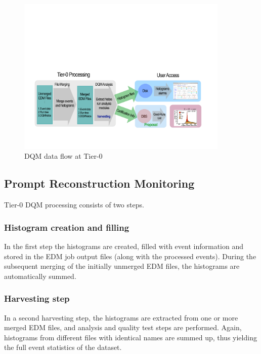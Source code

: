 
\begin{figure}[!htbp]
\begin{center}
\includegraphics[width=0.9\textwidth]{dqm_tier0}
\caption{DQM data flow at Tier-0}
\end{center}
\label{fig:dqmoffline}
\end{figure}

\subsection{Prompt Reconstruction Monitoring}

Tier-0 DQM processing consists of two steps. 

\subsubsection{Histogram creation and filling}
In the first step
the histograms are created, filled with event information and stored 
in the EDM job output files (along with the processed events).
During the subsequent merging of the initially unmerged EDM files, the 
histograms are automatically summed.


\subsubsection{Harvesting step}
In a second harvesting step, the histograms are extracted from one or 
more merged EDM files, and analysis and quality test steps are performed.
Again, histograms from different files with identical names are summed up,
thus yielding the full event statistics of the dataset.

